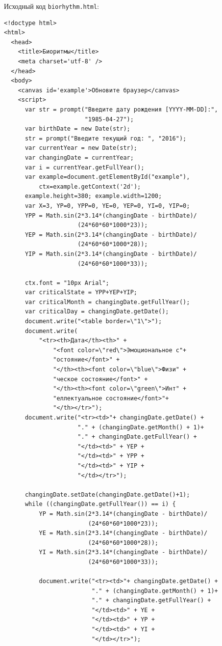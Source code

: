 Исходный код \verb|biorhythm.html|:

\begin{verbatim}
<!doctype html>
<html>
  <head>
    <title>Биоритмы</title>
    <meta charset='utf-8' />
  </head>
  <body>
    <canvas id='example'>Обновите браузер</canvas>
    <script>
      var str = prompt("Введите дату рождения [YYYY-MM-DD]:",
                       "1985-04-27");
      var birthDate = new Date(str);
      str = prompt("Введите текущий год: ", "2016");
      var currentYear = new Date(str);
      var changingDate = currentYear;
      var i = currentYear.getFullYear();
      var example=document.getElementById("example"),
          ctx=example.getContext('2d');
      example.height=380; example.width=1200;
      var X=3, YP=0, YPP=0, YE=0, YEP=0, YI=0, YIP=0;
      YPP = Math.sin(2*3.14*(changingDate - birthDate)/
                     (24*60*60*1000*23));
      YEP = Math.sin(2*3.14*(changingDate - birthDate)/
                     (24*60*60*1000*28));
      YIP = Math.sin(2*3.14*(changingDate - birthDate)/
                     (24*60*60*1000*33));

      ctx.font = "10px Arial";
      var criticalState = YPP+YEP+YIP;
      var criticalMonth = changingDate.getFullYear();
      var criticalDay = changingDate.getDate();
      document.write("<table border=\"1\">");
      document.write(
          "<tr><th>Дата</th><th>" +
              "<font color=\"red\">Эмоциональное с"+
              "остояние</font>" +
              "</th><th><font color=\"blue\">Физи" +
              "ческое состояние</font>" +
              "</th><th><font color=\"green\">Инт" +
              "еллектуальное состояние</font>"+
              "</th></tr>");
      document.write("<tr><td>"+ changingDate.getDate() +
                     "." + (changingDate.getMonth() + 1)+
                     "." + changingDate.getFullYear() +
                     "</td><td>" + YEP +
                     "</td><td>" + YPP +
                     "</td><td>" + YIP +
                     "</td></tr>");
      
      changingDate.setDate(changingDate.getDate()+1);
      while ((changingDate.getFullYear()) == i) {
          YP = Math.sin(2*3.14*(changingDate - birthDate)/
                        (24*60*60*1000*23));
          YE = Math.sin(2*3.14*(changingDate - birthDate)/
                        (24*60*60*1000*28));
          YI = Math.sin(2*3.14*(changingDate - birthDate)/
                        (24*60*60*1000*33));
          
          document.write("<tr><td>"+ changingDate.getDate() +
                         "." + (changingDate.getMonth() + 1)+
                         "." + changingDate.getFullYear() +
                         "</td><td>" + YE +
                         "</td><td>" + YP +
                         "</td><td>" + YI +
                         "</td></tr>");
          

\end{verbatim}
